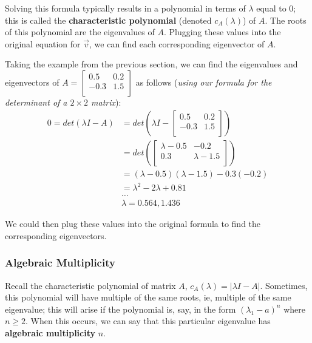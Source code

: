 \documentclass[12pt]{article}
\begin{document}
{{Solving this formula typically results in a polynomial in terms of $\lambda$ equal to 0; this is called the \textbf{characteristic polynomial} (denoted $c_A(\lambda)$) of $A$. The roots of this polynomial are the eigenvalues of $A$. Plugging these values into the original equation for $\vec{v}$, we can find each corresponding eigenvector of $A$.

Taking the example from the previous section, we can find the eigenvalues and eigenvectors of $A = \begin{bmatrix}
    0.5 & 0.2\\
    -0.3 & 1.5\\
\end{bmatrix}$ as follows (\textit{using our formula for the determinant of a $2 \times 2$ matrix}):
\begin{align*}
    0 = det(\lambda I - A) &= det(\lambda I - \begin{bmatrix}
        0.5 & 0.2\\
        -0.3 & 1.5\\
    \end{bmatrix})\\
    &= det(\begin{bmatrix}
    \lambda-0.5 & -0.2\\
    0.3 & \lambda-1.5\\
    \end{bmatrix})\\
    &= (\lambda - 0.5)(\lambda - 1.5) - 0.3(-0.2)\\
    &= \lambda^2-2\lambda+0.81\\
    &\dots\\
    & \lambda = 0.564, 1.436
\end{align*}

We could then plug these values into the original formula to find the corresponding eigenvectors.

\subsubsection{Algebraic Multiplicity}

Recall the characteristic polynomial of matrix $A$, $c_A(\lambda) = |\lambda I - A|$. Sometimes, this polynomial will have multiple of the same roots, ie, multiple of the same eigenvalue; this will arise if the polynomial is, say, in the form $(\lambda_1-a)^n$ where $n\geq 2$. When this occurs, we can say that this particular eigenvalue has \textbf{algebraic multiplicity} $n$.

}}
\end{document}
